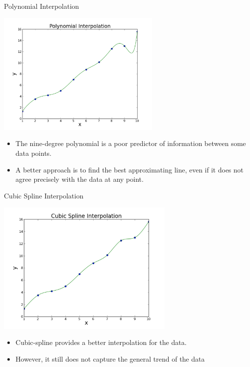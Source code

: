 \documentclass{beamer}
\begin{document}
\begin{frame}{Polynomial Interpolation}
\centerline{\includegraphics[width=0.6\textwidth]{Lec11_fig2.pdf}}

\begin{itemize}
\item The nine-degree polynomial is a \alert{poor} predictor of information between some data points. 
\item A better approach is to find the \alert{best approximating line}, even if it does not agree precisely with the data at \alert{any point}.
\end{itemize}
\end{frame}
\begin{frame}{Cubic Spline Interpolation}
\centerline{\includegraphics[width=0.65\textwidth]{Lec11_fig3.pdf}}

\begin{itemize}
\item Cubic-spline provides a better interpolation for the data.
\item However, it still does not capture the general trend of the data
\end{itemize}
\end{frame}
\end{document}
